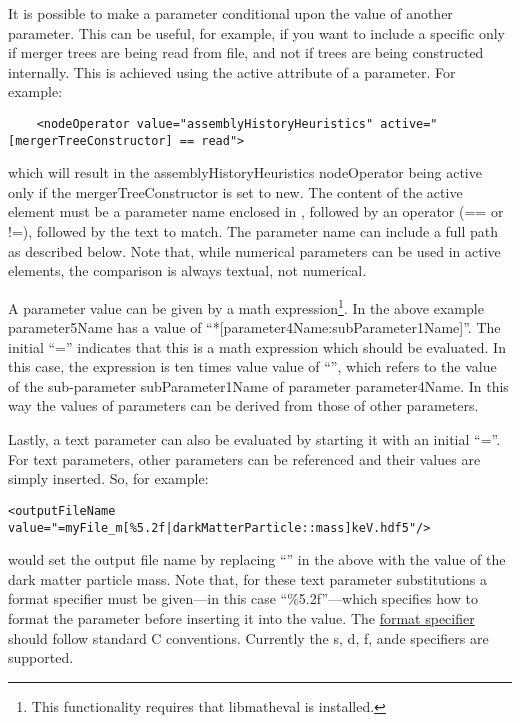 It is possible to make a parameter conditional upon the value of another parameter. This can be useful, for example, if you want to include a specific  only if merger trees are being read from file, and not if trees are being constructed internally. This is achieved using the {\normalfont \ttfamily active} attribute of a parameter. For example:
\begin{verbatim}
    <nodeOperator value="assemblyHistoryHeuristics" active="[mergerTreeConstructor] == read">
\end{verbatim}
which will result in the {\normalfont \ttfamily assemblyHistoryHeuristics} {\normalfont \ttfamily nodeOperator} being active only if the {\normalfont \ttfamily mergerTreeConstructor} is set to {\normalfont \ttfamily new}. The content of the {\normalfont \ttfamily active} element must be a parameter name enclosed in {\normalfont \ttfamily []}, followed by an operator ({\normalfont \ttfamily ==} or {\normalfont \ttfamily !=}), followed by the text to match. The parameter name can include a full path as described below. Note that, while numerical parameters can be used in {\normalfont \ttfamily active} elements, the comparison is always textual, not numerical.

A parameter value can be given by a math expression\footnote{This functionality requires that {\normalfont \ttfamily libmatheval} is installed.}. In the above example {\normalfont \ttfamily parameter5Name} has a value of ``{\normalfont {}*[parameter4Name:subParameter1Name]}''. The initial ``{\normalfont \ttfamily =}'' indicates that this is a math expression which should be evaluated. In this case, the expression is ten times value value of ``{\normalfont {}}'', which refers to the value of the sub-parameter {\normalfont \ttfamily subParameter1Name} of parameter {\normalfont \ttfamily parameter4Name}. In this way the values of parameters can be derived from those of other parameters.

Lastly, a text parameter can also be evaluated by starting it with an initial ``{\normalfont \ttfamily =}''. For text parameters, other parameters can be referenced and their values are simply inserted. So, for example:
\begin{verbatim}
<outputFileName value="=myFile_m[%5.2f|darkMatterParticle::mass]keV.hdf5"/>
\end{verbatim}
would set the output file name by replacing ``{\normalfont {}}'' in the above with the value of the dark matter particle mass. Note that, for these text parameter substitutions a format specifier must be given---in this case ``{\normalfont \ttfamily \%5.2f}''---which specifies how to format the parameter before inserting it into the value. The \href{https://www.w3resource.com/c-programming/stdio/c_library_method_sprintf.php}{format specifier} should follow standard C conventions. Currently the {\normalfont \ttfamily s}, {\normalfont \ttfamily d}, {\normalfont \ttfamily f}, and{\normalfont \ttfamily e} specifiers are supported.

